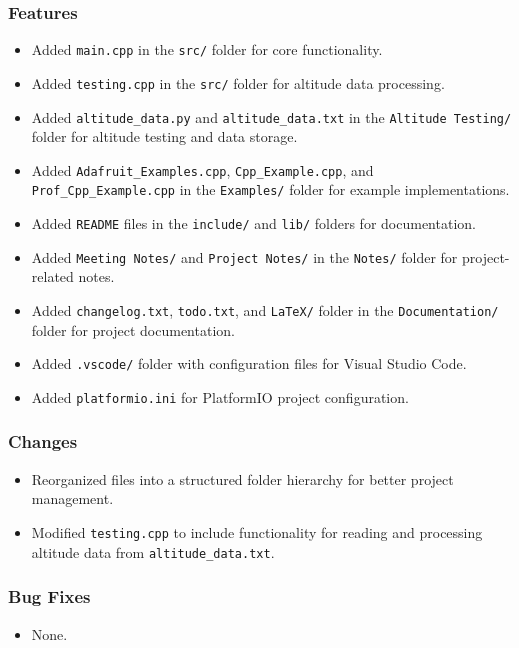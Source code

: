 \documentclass{article}
\begin{document}
\subsubsection{Features}
\begin{itemize}
    \item Added \texttt{main.cpp} in the \texttt{src/} folder for core functionality.
    \item Added \texttt{testing.cpp} in the \texttt{src/} folder for altitude data processing.
    \item Added \texttt{altitude\_data.py} and \texttt{altitude\_data.txt} in the \texttt{Altitude Testing/} folder for altitude testing and data storage.
    \item Added \texttt{Adafruit\_Examples.cpp}, \texttt{Cpp\_Example.cpp}, and \texttt{Prof\_Cpp\_Example.cpp} in the \texttt{Examples/} folder for example implementations.
    \item Added \texttt{README} files in the \texttt{include/} and \texttt{lib/} folders for documentation.
    \item Added \texttt{Meeting Notes/} and \texttt{Project Notes/} in the \texttt{Notes/} folder for project-related notes.
    \item Added \texttt{changelog.txt}, \texttt{todo.txt}, and \texttt{LaTeX/} folder in the \texttt{Documentation/} folder for project documentation.
    \item Added \texttt{.vscode/} folder with configuration files for Visual Studio Code.
    \item Added \texttt{platformio.ini} for PlatformIO project configuration.
\end{itemize}

\subsubsection{Changes}
\begin{itemize}
    \item Reorganized files into a structured folder hierarchy for better project management.
    \item Modified \texttt{testing.cpp} to include functionality for reading and processing altitude data from \texttt{altitude\_data.txt}.
\end{itemize}

\subsubsection{Bug Fixes}
\begin{itemize}
    \item None.
\end{itemize}
\end{document}
